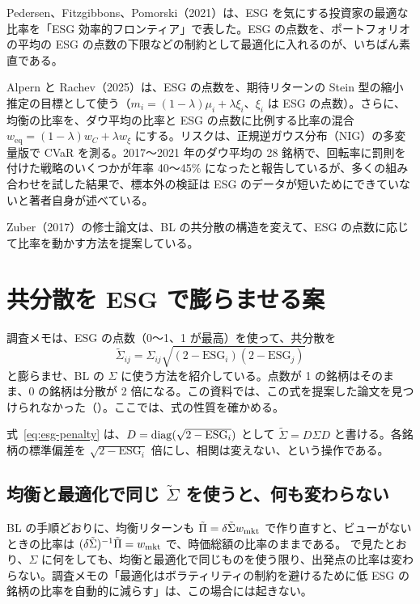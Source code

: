 \begin{description}[leftmargin=2em,style=nextline]
\item[好み・制約として] Pedersen、Fitzgibbons、Pomorski（2021）は、ESG を気にする投資家の最適な比率を「ESG 効率的フロンティア」で表した。ESG の点数を、ポートフォリオの平均の ESG の点数の下限などの制約として最適化に入れるのが、いちばん素直である。
\item[期待リターンの目標として] Alpern と Rachev（2025）は、ESG の点数を、期待リターンの Stein 型の縮小推定の目標として使う（$m_i=(1-\lambda)\mu_i+\lambda\xi_i$、$\xi_i$ は ESG の点数）。さらに、均衡の比率を、ダウ平均の比率と ESG の点数に比例する比率の混合 $w_{\mathrm{eq}}=(1-\lambda)w_C+\lambda w_\xi$ にする。リスクは、正規逆ガウス分布（NIG）の多変量版で CVaR を測る。2017〜2021 年のダウ平均の 28 銘柄で、回転率に罰則を付けた戦略のいくつかが年率 40〜45\% になったと報告しているが、多くの組み合わせを試した結果で、標本外の検証は ESG のデータが短いためにできていないと著者自身が述べている。
\item[共分散の構造として] Zuber（2017）の修士論文は、BL の共分散の構造を変えて、ESG の点数に応じて比率を動かす方法を提案している。
\end{description}

\section{共分散を ESG で膨らませる案}\label{sec:esg-penalty}

調査メモは、ESG の点数（0〜1、1 が最高）を使って、共分散を
\begin{equation}
\tilde\Sigma_{ij}=\Sigma_{ij}\sqrt{(2-\mathrm{ESG}_i)(2-\mathrm{ESG}_j)}
\label{eq:esg-penalty}
\end{equation}
と膨らませ、BL の $\Sigma$ に使う方法を紹介している。点数が 1 の銘柄はそのまま、0 の銘柄は分散が 2 倍になる。この資料では、この式を提案した論文を見つけられなかった（）。ここでは、式の性質を確かめる。

式~\eqref{eq:esg-penalty} は、$D=\operatorname{diag}(\sqrt{2-\mathrm{ESG}_i})$ として $\tilde\Sigma=D\Sigma D$ と書ける。各銘柄の標準偏差を $\sqrt{2-\mathrm{ESG}_i}$ 倍にし、相関は変えない、という操作である。

\subsection*{均衡と最適化で同じ $\tilde\Sigma$ を使うと、何も変わらない}

BL の手順どおりに、均衡リターンも $\tilde\Pi=\delta\tilde\Sigma w_{\mathrm{mkt}}$ で作り直すと、ビューがないときの比率は $(\delta\tilde\Sigma)^{-1}\tilde\Pi=w_{\mathrm{mkt}}$ で、時価総額の比率のままである。 で見たとおり、$\Sigma$ に何をしても、均衡と最適化で同じものを使う限り、出発点の比率は変わらない。調査メモの「最適化はボラティリティの制約を避けるために低 ESG の銘柄の比率を自動的に減らす」は、この場合には起きない。

